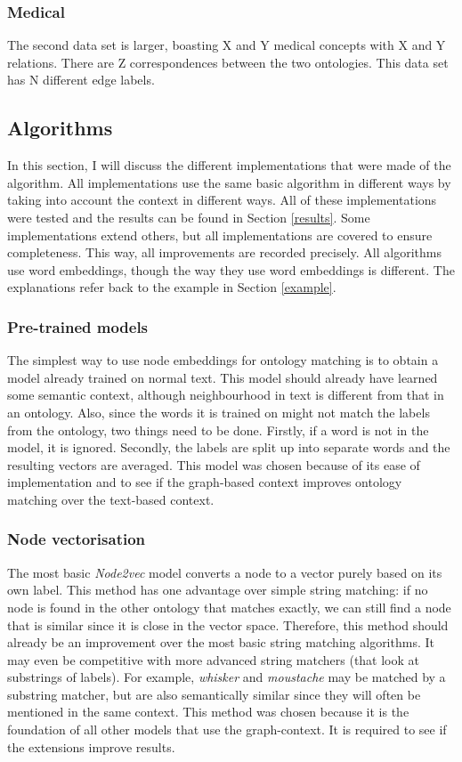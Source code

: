 \documentclass{article}
\begin{document}
 \subsubsection{Medical}
 The second data set is larger, boasting X and Y medical concepts with X and Y relations. There are Z correspondences between the two ontologies. This data set has N different edge labels.
 
 \subsection{Algorithms} \label{implementations}
 In this section, I will discuss the different implementations that were made of the algorithm. All implementations use the same basic algorithm in different ways by taking into account the context in different ways. All of these implementations were tested and the results can be found in Section \ref{results}. Some implementations extend others, but all implementations are covered to ensure completeness. This way, all improvements are recorded precisely.
 All algorithms use word embeddings, though the way they use word embeddings is different.  The explanations refer back to the example in Section \ref{example}.
  \subsubsection{Pre-trained models}
  The simplest way to use node embeddings for ontology matching is to obtain a model already trained on normal text. This model should already have learned some semantic context, although neighbourhood in text is different from that in an ontology. Also, since the words it is trained on might not match the labels from the ontology, two things need to be done. Firstly, if a word is not in the model, it is ignored. Secondly, the labels are split up into separate words and the resulting vectors are averaged.
  This model was chosen because of its ease of implementation and to see if the graph-based context improves ontology matching over the text-based context.
  \subsubsection{Node vectorisation}
  The most basic \emph{Node2vec} model converts a node to a vector purely based on its own label. This method has one advantage over simple string matching: if no node is found in the other ontology that matches exactly, we can still find a node that is similar since it is close in the vector space. Therefore, this method should already be an improvement over the most basic string matching algorithms. It may even be competitive with more advanced string matchers (that look at substrings of labels). For example, \emph{whisker} and \emph{moustache} may be matched by a substring matcher, but are also semantically similar since they will often be mentioned in the same context.
  This method was chosen because it is the foundation of all other models that use the graph-context. It is required to see if the extensions improve results.
\end{document}

